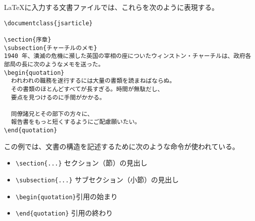 \LaTeX{}に入力する文書ファイルでは、これらを次のように表現する。
\begin{mdframed}[roundcorner=0.50zw,leftmargin=3.00zw,rightmargin=3.00zw,skipabove=0.40zw,skipbelow=0.40zw,innertopmargin=4.00pt,innerbottommargin=4.00pt,innerleftmargin=5.00pt,innerrightmargin=5.00pt,linecolor=gray!020,linewidth=0.50pt,backgroundcolor=gray!20]
\begin{verbatim}
\documentclass{jsarticle}

\section{序章}
\subsection{チャーチルのメモ}
1940 年、潰滅の危機に瀕した英国の宰相の座についたウィンストン・チャーチルは、政府各部局の長に次のようなメモを送った。
\begin{quotation}
  われわれの職務を遂行するには大量の書類を読まねばならぬ。
  その書類のほとんどすべてが長すぎる。時間が無駄だし、
  要点を見つけるのに手間がかかる。

  同僚諸兄とその部下の方々に、
  報告書をもっと短くするようにご配慮願いたい。
\end{quotation}

\end{verbatim}
\end{mdframed}
この例では、文書の構造を記述するために次のような命令が使われている。
\begin{itemize}\setlength{\leftskip}{-1.00zw}%
\item \verb'\section{...}'    セクション（節）の見出し
\item \verb`\subsection{...}` サブセクション（小節）の見出し
\item \verb`\begin{quotation}`引用の始まり
\item \verb`\end{quotation}`  引用の終わり
\end{itemize}

